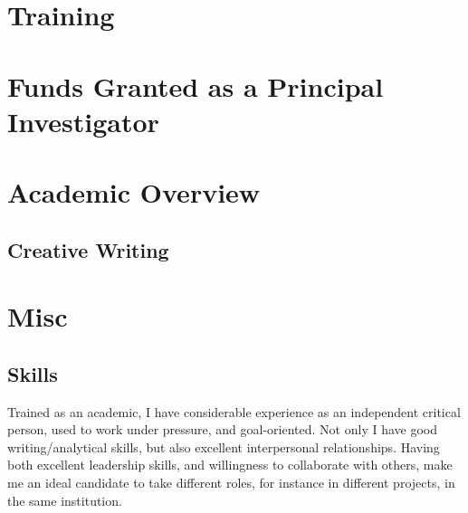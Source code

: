 \documentclass[letterpaper]{article}
\begin{document}
\section*{Training}

{\unskip}



\section*{Funds Granted as a Principal Investigator}
{\unskip}


\section*{Academic Overview}
{\unskip}

\subsection*{Creative Writing}
{\unskip}


\section*{Misc}

\subsection*{Skills}
Trained as an academic, I have considerable experience as an independent critical person, used to work under pressure, and goal-oriented. Not only I have good writing/analytical skills, but also excellent interpersonal relationships. Having both excellent leadership skills, and willingness to collaborate with others, make me an ideal candidate to take different roles, for instance in different projects, in the same institution. 


{\unskip}




\bigskip
\end{document}
